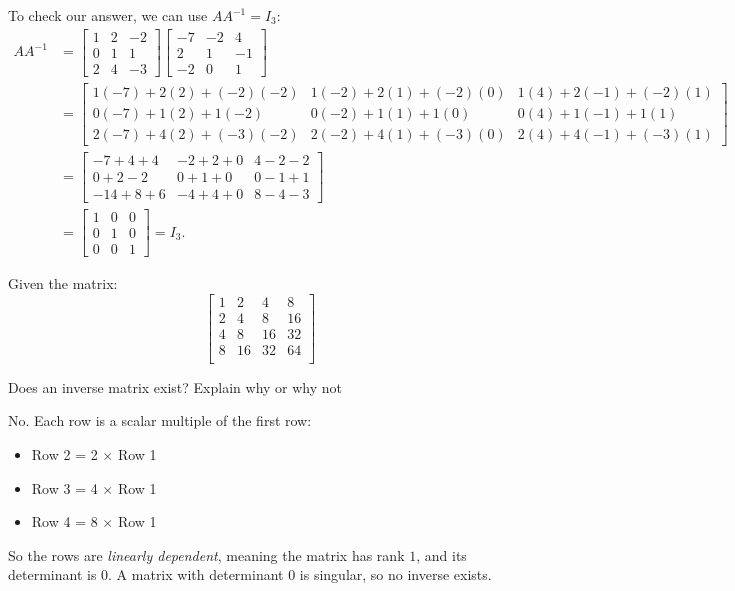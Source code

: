 \begin{Answer}[ref={ex:inverse2}]
To check our answer, we can use $AA^{-1} = I_3$:
\begin{align*}
A A^{-1}
&=
\begin{bmatrix}
1 & 2 & -2\\[4pt]
0 & 1 & 1\\[4pt]
2 & 4 & -3
\end{bmatrix}
\begin{bmatrix}
-7 & -2 & 4\\[4pt]
2 & 1 & -1\\[4pt]
-2 & 0 & 1
\end{bmatrix} \\[8pt]
&=
\begin{bmatrix}
1(-7)+2(2)+(-2)(-2) & 1(-2)+2(1)+(-2)(0) & 1(4)+2(-1)+(-2)(1)\\[6pt]
0(-7)+1(2)+1(-2)    & 0(-2)+1(1)+1(0)     & 0(4)+1(-1)+1(1)\\[6pt]
2(-7)+4(2)+(-3)(-2) & 2(-2)+4(1)+(-3)(0) & 2(4)+4(-1)+(-3)(1)
\end{bmatrix} \\[8pt]
&=
\begin{bmatrix}
-7+4+4 & -2+2+0 & 4-2-2\\[6pt]
0+2-2  & 0+1+0  & 0-1+1\\[6pt]
-14+8+6& -4+4+0 & 8-4-3
\end{bmatrix} \\[8pt]
&=
\begin{bmatrix}
1 & 0 & 0\\[4pt]
0 & 1 & 0\\[4pt]
0 & 0 & 1
\end{bmatrix}
=I_3.
\end{align*}
\end{Answer}
\begin{Exercise}[title={Does a matrix exist?}, label={ex:inverse3}]
Given the matrix:
\[\begin{bmatrix}
1 & 2 & 4 & 8\\
2 & 4 & 8 & 16 \\
4 & 8 & 16 & 32 \\
8 & 16 & 32 & 64 \\
\end{bmatrix}\]

Does an inverse matrix exist? Explain why or why not
\end{Exercise}
\begin{Answer}[ref={ex:inverse3}]
No. Each row is a scalar multiple of the first row:
\begin{itemize}
    \item Row 2 = 2 $\times$ Row 1
    \item Row 3 = 4 $\times$ Row 1
    \item Row 4 = 8 $\times$ Row 1
\end{itemize}
So the rows are \emph{linearly dependent}, meaning the matrix has rank $1$, and its determinant is 0. A matrix with determinant 0 is singular, so no inverse exists.
\end{Answer}

